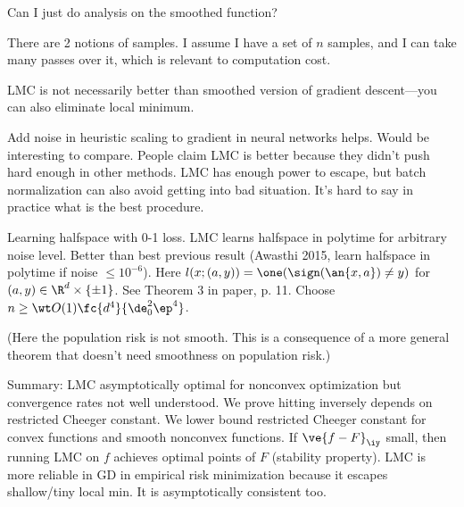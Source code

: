 Can I just do analysis on the smoothed function?

There are 2 notions of samples. I assume I have a set of $n$ samples, and I can take many passes over it, which is relevant to computation cost.

LMC is not necessarily better than smoothed version of gradient descent---you can also eliminate local minimum.


Add noise in heuristic scaling to gradient  in neural networks helps. Would be interesting to compare. People claim LMC is better because they didn't push hard enough in other methods. LMC has enough power to escape, but batch normalization can also avoid getting into bad situation. It's hard to say in practice what is the best procedure.

Learning halfspace with 0-1 loss. LMC learns halfspace in polytime for arbitrary noise level. Better than best previous result (Awasthi 2015, learn halfspace in polytime if noise $\le 10^{-6}$). Here $l(x;(a,y))=\one(\sign(\an{x,a})\ne y)$ for $(a,y)\in \R^d\times\{\pm 1\}$. See Theorem 3 in paper, p. 11.  Choose $n\ge \wt O(1) \fc{d^4}{\de_0^2\ep^4}$.


(Here the population risk is not smooth. This is a consequence of a more general theorem that doesn't need smoothness on population risk.)


Summary: LMC asymptotically optimal for nonconvex optimization but convergence rates not well understood. We prove hitting inversely depends on restricted Cheeger constant. We lower bound restricted Cheeger constant for convex functions and smooth nonconvex functions. If $\ve{f-F}_\iy$ small, then running LMC on $f$ achieves optimal points of $F$ (stability property). LMC is more reliable in GD in empirical risk minimization because it escapes shallow/tiny local min. It is asymptotically consistent too. 

